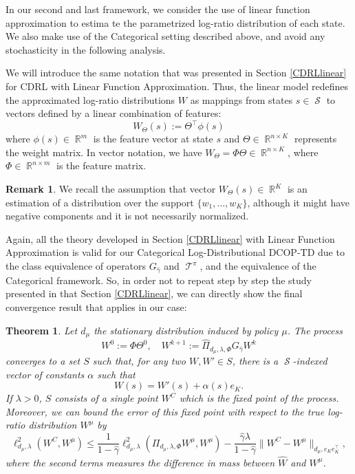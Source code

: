 \documentclass[12pt,a4paper,openright,twoside]{article}
\DeclareMathOperator*{\R}{\mathbb{R}}
\DeclareMathOperator*{\Sspace}{\mathcal{S}}
\DeclareMathOperator*{\T}{\mathcal{T}}
\numberwithin{equation}{section}
\newtheorem{theorem}{Theorem}[section]
\theoremstyle{definition}
\newtheorem*{remark}{Remark}
\theoremstyle{remark}
\theoremstyle{plain}
\begin{document}
In our second and last framework, we consider the use of linear function approximation to estima te the parametrized log-ratio distribution of each state. We also make use of the Categorical setting described above, and avoid any stochasticity in the following analysis.

We will introduce the same notation that was presented in Section \ref{CDRLlinear} for CDRL with Linear Function Approximation. Thus, the linear model redefines the approximated log-ratio distributions $W$ as mappings from states $s\in \Sspace$ to vectors defined by a linear combination of features:
\begin{equation}
	W_{\Theta}(s) := \Theta^\top \phi(s)
\end{equation}
where $\phi(s)\in \R^m$ is the feature vector at state $s$ and $\Theta \in \R^{n\times K}$ represents the weight matrix. In vector notation, we have $W_{\Theta} = \Phi \Theta \in \R^{n\times K}$, where $\Phi \in \R^{n \times m}$ is the feature matrix.

\begin{remark}
	We recall the assumption that vector $W_{\Theta}(s) \in \R^{K}$ is an estimation of a distribution over the support $\{w_1,\dots,w_K\}$, although it might have negative components and it is not necessarily normalized.
\end{remark}

Again, all the theory developed in Section \ref{CDRLlinear} with Linear Function Approximation is valid for our Categorical Log-Distributional DCOP-TD due to the class equivalence of operators $G_{\hat{\gamma}}$ and $\T^\pi$, and the equivalence of the Categorical framework. So, in order not to repeat step by step the study presented in that Section \ref{CDRLlinear}, we can directly show the final convergence result that applies in our case:



\begin{theorem} \label{convergenceLinearCDDCOPTD}
	Let $d_\mu$ the stationary distribution induced by policy $\mu$. The process
	\begin{equation*}
		W^0 := \Phi \Theta^0, \quad W^{k+1} := \hat{\Pi}_{d_\mu,\lambda,\Phi} G_{\hat{\gamma}} W^k
	\end{equation*}
	converges to a set $S$ such that, for any two $W, W' \in S$, there is a $\Sspace$-indexed vector of constants $\alpha$ such that
	\begin{equation*}
		W(s) = W'(s) + \alpha(s)e_K.
	\end{equation*}
	If $\lambda > 0$, $S$ consists of a single point $W^C$ which is the fixed point of the process. Moreover, we can bound the error of this fixed point with respect to the true log-ratio distribution $W^\mu$ by
	\begin{equation*}
		\ell^2_{d_\mu, \lambda} (W^C, W^\mu) \leq \frac{1}{1-\hat{\gamma}} \ell^2_{d_\mu, \lambda} (\Pi_{d_\mu,\lambda,\Phi} W^\mu, W^\mu) - \frac{\hat{\gamma} \lambda}{1-\hat{\gamma}} \| W^C - W^\mu \|_{d_\mu, e_Ke_K^\top},
	\end{equation*}
	where the second terms measures the difference in mass between $\hat{W}$ and $W^\mu$.
\end{theorem}
\end{document}
